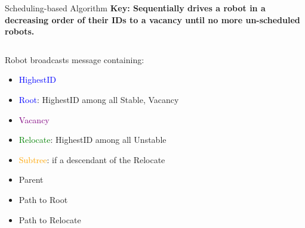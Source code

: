 \begin{frame}{Scheduling-based Algorithm}
  \textbf{\small{Key: Sequentially drives a robot in a decreasing order of their IDs to a vacancy until no more un-scheduled robots.}}
  \begin{columns}[T] %
    \begin{column}{.5\textwidth}
      \small{
        Robot broadcasts message containing:
        \begin{itemize}
        \item \textcolor{blue}{HighestID} 
        \item \textcolor{blue}{Root}: HighestID among all Stable, Vacancy
        \item \textcolor{purple}{Vacancy}
        \item \textcolor{green}{Relocate}: HighestID among all Unstable 
        \item \textcolor{orange}{Subtree}: if a descendant of the Relocate
        \item Parent 
        \item Path to Root
        \item Path to Relocate
        \end{itemize}
      }
    \end{column}%
    \begin{column}{.4\textwidth}
      
    \end{column}%
  \end{columns}
\end{frame}